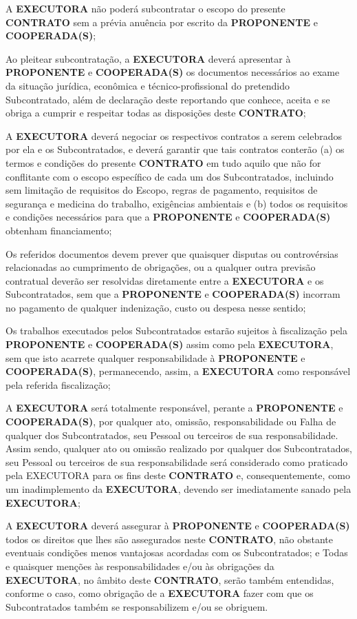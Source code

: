 
\xx A \textbf{EXECUTORA} não poderá subcontratar o escopo do presente \textbf{CONTRATO} sem a prévia anuência por escrito da \textbf{PROPONENTE} e \textbf{COOPERADA(S)};

\xx Ao pleitear subcontratação, a \textbf{EXECUTORA} deverá apresentar à \textbf{PROPONENTE} e \textbf{COOPERADA(S)} os documentos necessários ao exame da situação jurídica, econômica e técnico-profissional do pretendido Subcontratado, além de declaração deste reportando que conhece, aceita e se obriga a cumprir e respeitar todas as disposições deste \textbf{CONTRATO};

\xx A \textbf{EXECUTORA} deverá negociar os respectivos contratos a serem celebrados por ela e os Subcontratados, e deverá garantir que tais contratos conterão (a) os termos e condições do presente \textbf{CONTRATO} em tudo aquilo que não for conflitante com o escopo específico de cada um dos Subcontratados, incluindo sem limitação de requisitos do Escopo, regras de pagamento, requisitos de segurança e medicina do trabalho, exigências ambientais e (b) todos os requisitos e condições necessários para que a \textbf{PROPONENTE} e \textbf{COOPERADA(S)} obtenham financiamento;

\xx Os referidos documentos devem prever que quaisquer disputas ou controvérsias relacionadas ao cumprimento de obrigações, ou a qualquer outra previsão contratual deverão ser resolvidas diretamente entre a \textbf{EXECUTORA} e os Subcontratados, sem que a \textbf{PROPONENTE} e \textbf{COOPERADA(S)} incorram no pagamento de qualquer indenização, custo ou despesa nesse sentido;

\xx Os trabalhos executados pelos Subcontratados estarão sujeitos à fiscalização pela \textbf{PROPONENTE} e \textbf{COOPERADA(S)} assim como pela \textbf{EXECUTORA}, sem que isto acarrete qualquer responsabilidade à \textbf{PROPONENTE} e \textbf{COOPERADA(S)}, permanecendo, assim, a \textbf{EXECUTORA} como responsável pela referida fiscalização;

\xx A \textbf{EXECUTORA} será totalmente responsável, perante a \textbf{PROPONENTE} e \textbf{COOPERADA(S)}, por qualquer ato, omissão, responsabilidade ou Falha de qualquer dos Subcontratados, seu Pessoal ou terceiros de sua responsabilidade. Assim sendo, qualquer ato ou omissão realizado por qualquer dos Subcontratados, seu Pessoal ou terceiros de sua responsabilidade será considerado como praticado pela EXECUTORA para os fins deste \textbf{CONTRATO} e, consequentemente, como um inadimplemento da \textbf{EXECUTORA}, devendo ser imediatamente sanado pela \textbf{EXECUTORA};

\xx A \textbf{EXECUTORA} deverá assegurar à \textbf{PROPONENTE} e \textbf{COOPERADA(S)} todos os direitos que lhes são assegurados neste \textbf{CONTRATO}, não obstante eventuais condições menos vantajosas acordadas com os Subcontratados; e
Todas e quaisquer menções às responsabilidades e/ou às obrigações da \textbf{EXECUTORA}, no âmbito deste \textbf{CONTRATO}, serão também entendidas, conforme o caso, como obrigação de a \textbf{EXECUTORA} fazer com que os Subcontratados também se responsabilizem e/ou se obriguem.